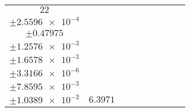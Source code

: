 \documentclass[8pt]{article}
\begin{document}
\begin{longtable}[l]{c c c c c c c c c}
$\num{22}$ & \begin{tabular}[c]{@{}c@{}}$\num{3.071e-2}$ \\ $\pm\num{2.5596e-4}$\end{tabular} & \begin{tabular}[c]{@{}c@{}}$\num{0.23708}$ \\ $\pm\num{0.47975}$\end{tabular} & \begin{tabular}[c]{@{}c@{}}$\num{8.2028}$ \\ $\pm\num{1.2576e-3}$\end{tabular} & \begin{tabular}[c]{@{}c@{}}$\num{3.6349e+3}$ \\ $\pm\num{1.6578e-3}$\end{tabular} & \begin{tabular}[c]{@{}c@{}}$\num{7.2718}$ \\ $\pm\num{3.3166e-6}$\end{tabular} & \begin{tabular}[c]{@{}c@{}}$\num{0.755}$ \\ $\pm\num{7.8595e-3}$\end{tabular} & \begin{tabular}[c]{@{}c@{}}$\num{0.74272}$ \\ $\pm\num{1.0389e-2}$\end{tabular} & $\num{6.3971}$\\
\bottomrule
\end{longtable}
\end{document}
